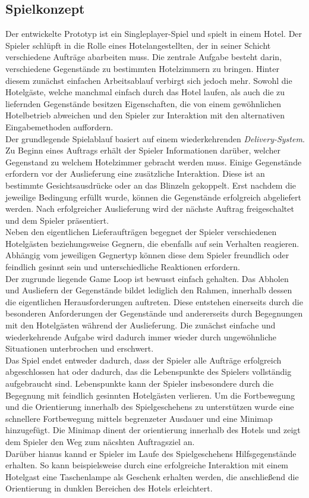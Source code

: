 \documentclass[intern]{cgMA}
\begin{document}
\subsection{Spielkonzept}
Der entwickelte Prototyp ist ein Singleplayer-Spiel und spielt in einem Hotel. Der Spieler schlüpft in die Rolle eines Hotelangestellten, der in seiner Schicht verschiedene Aufträge abarbeiten muss. Die zentrale Aufgabe besteht darin, verschiedene Gegenstände zu bestimmten Hotelzimmern zu bringen. Hinter diesem zunächst einfachen Arbeitsablauf verbirgt sich jedoch mehr. Sowohl die Hotelgäste, welche manchmal einfach durch das Hotel laufen, als auch die zu liefernden Gegenstände besitzen Eigenschaften, die von einem gewöhnlichen Hotelbetrieb abweichen und den Spieler zur Interaktion mit den alternativen Eingabemethoden auffordern.\\
Der grundlegende Spielablauf basiert auf einem wiederkehrenden \textit{Delivery-System}. Zu Beginn eines Auftrags erhält der Spieler Informationen darüber, welcher Gegenstand zu welchem Hotelzimmer gebracht werden muss. Einige Gegenstände erfordern vor der Auslieferung eine zusätzliche Interaktion. Diese ist an bestimmte Gesichtsausdrücke oder an das Blinzeln gekoppelt. Erst nachdem die jeweilige Bedingung erfüllt wurde, können die Gegenstände erfolgreich abgeliefert werden. Nach erfolgreicher Auslieferung wird der nächste Auftrag freigeschaltet und dem Spieler präsentiert.\\
Neben den eigentlichen Lieferaufträgen begegnet der Spieler verschiedenen Hotelgästen beziehungsweise Gegnern, die ebenfalls auf sein Verhalten reagieren. Abhängig vom jeweiligen Gegnertyp können diese dem Spieler freundlich oder feindlich gesinnt sein und unterschiedliche Reaktionen erfordern.\\
Der zugrunde liegende Game Loop ist bewusst einfach gehalten. Das Abholen und Ausliefern der Gegenstände bildet lediglich den Rahmen, innerhalb dessen die eigentlichen Herausforderungen auftreten. Diese entstehen einerseits durch die besonderen Anforderungen der Gegenstände und andererseits durch Begegnungen mit den Hotelgästen während der Auslieferung. Die zunächst einfache und wiederkehrende Aufgabe wird dadurch immer wieder durch ungewöhnliche Situationen unterbrochen und erschwert.\\
Das Spiel endet entweder dadurch, dass der Spieler alle Aufträge erfolgreich abgeschlossen hat oder dadurch, das die Lebenspunkte des Spielers vollständig aufgebraucht sind. Lebenspunkte kann der Spieler insbesondere durch die Begegnung mit feindlich gesinnten Hotelgästen verlieren. Um die Fortbewegung und die Orientierung innerhalb des Spielgeschehens zu unterstützen wurde eine schnellere Fortbewegung mittels begrenzeter Ausdauer und eine Minimap hinzugefügt. Die Minimap dinent der orientierung innerhalb des Hotels und zeigt dem Spieler den Weg zum näcshten Auftragsziel an.\\
Darüber hianus kannd er Spieler im Laufe des Spielgeschehens Hilfsgegenstände erhalten. So kann beispielsweise durch eine erfolgreiche Interaktion mit einem Hotelgast eine Taschenlampe als Geschenk erhalten werden, die anschließend die Orientierung in dunklen Bereichen des Hotels erleichtert.
\end{document}
